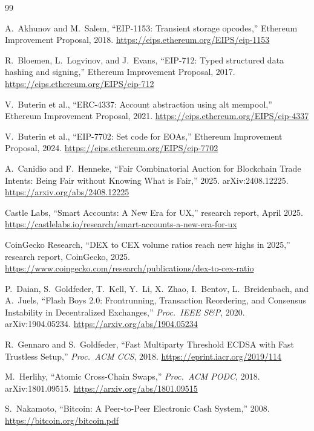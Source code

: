 {\footnotesize
\begin{thebibliography}{99}
\setlength{\itemsep}{0pt}\setlength{\parskip}{0pt}

A.~Akhunov and M.~Salem,
``EIP-1153: Transient storage opcodes,'' Ethereum Improvement Proposal, 2018.
\url{https://eips.ethereum.org/EIPS/eip-1153}

R.~Bloemen, L.~Logvinov, and J.~Evans,
``EIP-712: Typed structured data hashing and signing,'' Ethereum Improvement Proposal, 2017.
\url{https://eips.ethereum.org/EIPS/eip-712}

V.~Buterin et al.,
``ERC-4337: Account abstraction using alt mempool,'' Ethereum Improvement Proposal, 2021.
\url{https://eips.ethereum.org/EIPS/eip-4337}

V.~Buterin et al.,
``EIP-7702: Set code for EOAs,'' Ethereum Improvement Proposal, 2024.
\url{https://eips.ethereum.org/EIPS/eip-7702}

A.~Canidio and F.~Henneke,
``Fair Combinatorial Auction for Blockchain Trade Intents: Being Fair without Knowing What is Fair,'' 2025. arXiv:2408.12225.
\url{https://arxiv.org/abs/2408.12225}

Castle Labs,
``Smart Accounts: A New Era for UX,'' research report, April 2025.
\url{https://castlelabs.io/research/smart-accounts-a-new-era-for-ux}

CoinGecko Research,
``DEX to CEX volume ratios reach new highs in 2025,'' research report, CoinGecko, 2025.
\url{https://www.coingecko.com/research/publications/dex-to-cex-ratio}

P.~Daian, S.~Goldfeder, T.~Kell, Y.~Li, X.~Zhao, I.~Bentov, L.~Breidenbach, and A.~Juels,
``Flash Boys 2.0: Frontrunning, Transaction Reordering, and Consensus Instability in Decentralized Exchanges,'' \emph{Proc.\ IEEE S\&P}, 2020. arXiv:1904.05234.
\url{https://arxiv.org/abs/1904.05234}

R.~Gennaro and S.~Goldfeder,
``Fast Multiparty Threshold ECDSA with Fast Trustless Setup,'' \emph{Proc.\ ACM CCS}, 2018.
\url{https://eprint.iacr.org/2019/114}

M.~Herlihy,
``Atomic Cross-Chain Swaps,'' \emph{Proc.\ ACM PODC}, 2018. arXiv:1801.09515.
\url{https://arxiv.org/abs/1801.09515}

S.~Nakamoto,
``Bitcoin: A Peer-to-Peer Electronic Cash System,'' 2008.
\url{https://bitcoin.org/bitcoin.pdf}


\end{thebibliography}}
